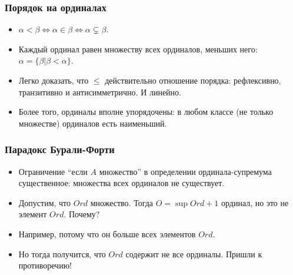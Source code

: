 \documentclass[10pt]{beamer}
\begin{document}
\begin{frame}
    \frametitle{Порядок на ординалах}
    \begin{itemize}
        \item $\alpha < \beta \Leftrightarrow \alpha \in \beta \Leftrightarrow \alpha \subsetneq \beta$.
        \item Каждый ординал равен множеству всех ординалов, меньших него: $\alpha = \{\beta | \beta < \alpha\}$.
        \item Легко доказать, что $\leq$ действительно отношение порядка: рефлексивно, транзитивно и антисимметрично. И линейно.
        \item Более того, ординалы вполне упорядочены: в любом классе (не только множестве) ординалов есть наименьший.
    \end{itemize}
\end{frame}

\begin{frame}
    \frametitle{Парадокс Бурали-Форти}
    \begin{itemize}
        \item Ограничение \enquote{если $A$ множество} в определении ординала-супремума существенное: множества всех ординалов не существует.
        \item Допустим, что $Ord$ множество. Тогда $O = \sup Ord + 1$ ординал, но это не элемент $Ord$. Почему? \pause
        \item Например, потому что он больше всех элементов $Ord$. \pause
        \item Но тогда получится, что $Ord$ содержит не все ординалы. Пришли к противоречию!
    \end{itemize}
\end{frame}
\end{document}
